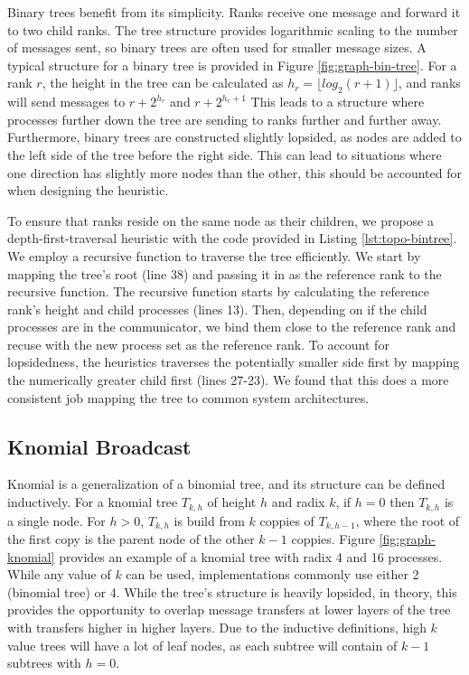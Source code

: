 Binary trees benefit from its simplicity.
Ranks receive one message and forward it to two child ranks.
The tree structure provides logarithmic scaling to the number of messages sent, so binary trees are often used for smaller message sizes. 
A typical structure for a binary tree is provided in Figure \ref{fig:graph-bin-tree}.
For a rank $r$, the height in the tree can be calculated as $h_r = \lfloor log_2(r+1) \rfloor$, and ranks will send messages to $r + 2^{h_r}$ and $r + 2^{h_r + 1}$
This leads to a structure where processes further down the tree are sending to ranks further and further away.
Furthermore, binary trees are constructed slightly lopsided,  as nodes are added to the left side of the tree before the right side. 
This can lead to situations where one direction has slightly more nodes than the other, this should be accounted for when designing the heuristic.

To ensure that ranks reside on the same node as their children, we propose a depth-first-traversal heuristic with the code provided in Listing \ref{lst:topo-bintree}.
We employ a recursive function to traverse the tree efficiently. 
We start by mapping the tree's root (line 38) and passing it in as the reference rank to the recursive function.
The recursive function starts by calculating the reference rank's height and child processes (lines 13). 
Then, depending on if the child processes are in the communicator, we bind them close to the reference rank and recuse with the new process set as the reference rank.
To account for lopsidedness, the heuristics traverses the potentially smaller side first by mapping the numerically greater child first (lines 27-23).
We found that this does a more consistent job mapping the tree to common system architectures.

\subsection{Knomial Broadcast}


\lstset{label = lst:topo-knomial}
\lstset{caption = Heuristic for rank reordering knomial trees.}


Knomial is a generalization of a binomial tree, and its structure can be defined inductively.
For a knomial tree $T_{k,h}$ of height $h$ and radix $k$, if $h=0$ then $T_{k,h}$ is a single node. For $h>0$, $T_{k,h}$ is build from $k$ coppies of $T_{k,h-1}$, where the root of the first copy is the parent node of the other $k-1$ coppies.
Figure \ref{fig:graph-knomial} provides an example of a knomial tree with radix 4 and 16 processes.
While any value of $k$ can be used, implementations commonly use either 2 (binomial tree) or 4. 
While the tree's structure is heavily lopsided, in theory, this provides the opportunity to overlap message transfers at lower layers of the tree with transfers higher in higher layers.
Due to the inductive definitions, high $k$ value trees will have a lot of leaf nodes, as each subtree will contain of $k-1$ subtrees with $h=0$.

